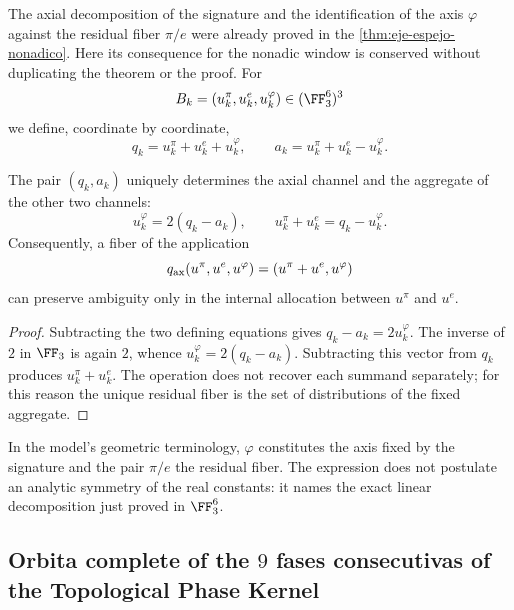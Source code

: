 \ifdefined\HMTAxialTheoremDefined
The axial decomposition of the signature and the identification of the axis
\(\varphi\) against the residual fiber \(\pi/e\) were already proved in the
\cref{thm:eje-espejo-nonadico}. Here its consequence for the
nonadic window is conserved without duplicating the theorem or the proof.
\else
For
\[
B_k=(u_k^\pi,u_k^e,u_k^\varphi)\in(\FF_3^6)^3
\]
we define, coordinate by coordinate,
\[
q_k=u_k^\pi+u_k^e+u_k^\varphi,
\qquad
a_k=u_k^\pi+u_k^e-u_k^\varphi.
\]

\begin{theorem}
\label{thm:eje-espejo-nonadico}
The pair \((q_k,a_k)\) uniquely determines the axial channel and the aggregate of
the other two channels:
\[
u_k^\varphi=2(q_k-a_k),
\qquad
u_k^\pi+u_k^e=q_k-u_k^\varphi.
\]
Consequently, a fiber of the application
\[
q_{\rm ax}(u^\pi,u^e,u^\varphi)
=(u^\pi+u^e,u^\varphi)
\]
can preserve ambiguity only in the internal allocation between \(u^\pi\) and
\(u^e\).
\end{theorem}

\begin{proof}
Subtracting the two defining equations gives
\(q_k-a_k=2u_k^\varphi\). The inverse of \(2\) in \(\FF_3\) is again
\(2\), whence
\(u_k^\varphi=2(q_k-a_k)\). Subtracting this vector from \(q_k\) produces
\(u_k^\pi+u_k^e\). The operation does not recover each summand separately; for
this reason the unique residual fiber is the set of distributions of the fixed aggregate.
\end{proof}

In the model's geometric terminology, \(\varphi\) constitutes the axis
fixed by the signature and the pair \(\pi/e\) the residual fiber. The expression does not
postulate an analytic symmetry of the real constants: it names the
exact linear decomposition just proved in \(\FF_3^6\).
\fi

\subsection{Orbita complete of the \(9\) fases consecutivas of the Topological Phase Kernel}

